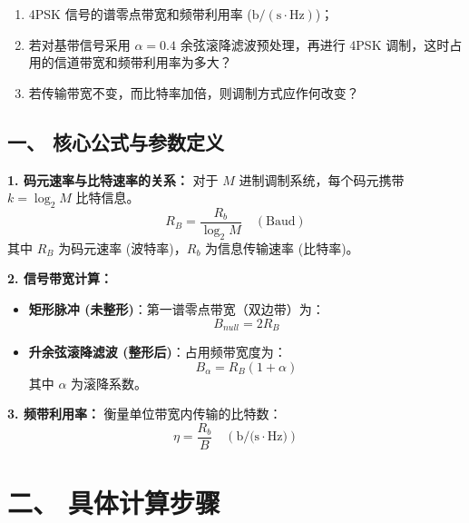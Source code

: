 \documentclass[a4paper,11pt]{ctexart}
\begin{document}
\begin{enumerate}[label=(\arabic*)]
    \item 4PSK 信号的谱零点带宽和频带利用率 ($\text{b}/(\text{s}\cdot\text{Hz})$)；
    \item 若对基带信号采用 $\alpha = 0.4$ 余弦滚降滤波预处理，再进行 4PSK 调制，这时占用的信道带宽和频带利用率为多大？
    \item 若传输带宽不变，而比特率加倍，则调制方式应作何改变？
\end{enumerate}
\begin{tcolorbox}[colback=white, colframe=blue!50!black, title=\textbf{题目解答：8-1 4PSK 系统的带宽与频带利用率}]

    \section*{一、 核心公式与参数定义}
    
    \textbf{1. 码元速率与比特速率的关系：}
    对于 $M$ 进制调制系统，每个码元携带 $k = \log_2 M$ 比特信息。
    \begin{equation}
        R_B = \frac{R_b}{\log_2 M} \quad (\text{Baud})
    \end{equation}
    其中 $R_B$ 为码元速率 (波特率)，$R_b$ 为信息传输速率 (比特率)。
    
    \textbf{2. 信号带宽计算：}
    \begin{itemize}
        \item \textbf{矩形脉冲 (未整形)}：第一谱零点带宽（双边带）为：
            \begin{equation}
                B_{null} = 2 R_B
            \end{equation}
        \item \textbf{升余弦滚降滤波 (整形后)}：占用频带宽度为：
            \begin{equation}
                B_{\alpha} = R_B (1 + \alpha)
            \end{equation}
            其中 $\alpha$ 为滚降系数。
    \end{itemize}
    
    \textbf{3. 频带利用率：}
    衡量单位带宽内传输的比特数：
    \begin{equation}
        \eta = \frac{R_b}{B} \quad (\text{b/(s}\cdot\text{Hz)})
    \end{equation}

    \end{tcolorbox}

    \section*{二、 具体计算步骤}
    
\end{document}
